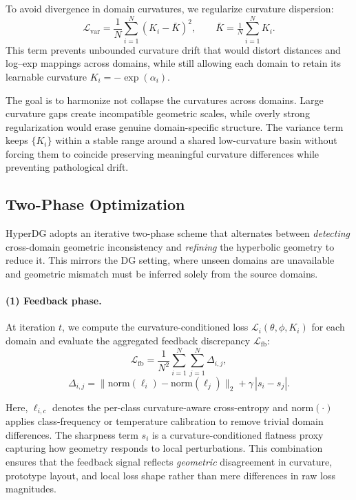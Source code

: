 \documentclass[10pt]{article} %
\begin{document}
To avoid divergence in domain curvatures, we regularize curvature dispersion:
\begin{equation}
\mathcal{L}_{\mathrm{var}}
=
\frac{1}{N}
\sum_{i=1}^{N}(K_i - \bar{K})^2,
\qquad
\bar{K}=\tfrac{1}{N}\sum_{i=1}^{N}K_i .
\label{eq:curvvar-lorentz}
\end{equation}
This term prevents unbounded curvature drift that would distort distances and
log--exp mappings across domains, while still allowing each domain to retain
its learnable curvature $K_i = -\exp(\alpha_i)$.

The goal is to harmonize not collapse the curvatures across domains.
Large curvature gaps create incompatible geometric scales, while overly strong
regularization would erase genuine domain-specific structure. The variance term
keeps $\{K_i\}$ within a stable range around a shared low-curvature basin
without forcing them to coincide preserving meaningful
curvature differences while preventing pathological drift.


\subsection{Two-Phase Optimization}
\label{sec:two-phase}

HyperDG adopts an iterative two-phase scheme that alternates between
\emph{detecting} cross-domain geometric inconsistency and \emph{refining}
the hyperbolic geometry to reduce it. This mirrors the DG setting, where unseen
domains are unavailable and geometric mismatch must be inferred solely from the
source domains.
\paragraph{(1) Feedback phase.}
At iteration $t$, we compute the curvature-conditioned loss
$\mathcal{L}_i(\theta,\phi,K_i)$ for each domain and evaluate the aggregated
feedback discrepancy $\mathcal{L}_{\mathrm{fb}}$:
\[
\mathcal{L}_{\mathrm{fb}}
= \frac{1}{N^2}
\sum_{i=1}^{N}\sum_{j=1}^{N}
\Delta_{i,j},
\]
\[
\Delta_{i,j}
= \|\mathrm{norm}(\ell_i)-\mathrm{norm}(\ell_j)\|_2
+ \gamma\,|s_i-s_j|.
\]


Here, $\ell_{i,c}$ denotes the per-class curvature-aware cross-entropy and
$\mathrm{norm}(\cdot)$ applies class-frequency or temperature calibration to
remove trivial domain differences. The sharpness term $s_i$ is a
curvature-conditioned flatness proxy capturing how geometry responds to local
perturbations. This combination ensures that the feedback signal reflects
\emph{geometric} disagreement in curvature, prototype layout, and local loss
shape rather than mere differences in raw loss magnitudes.
\end{document}
